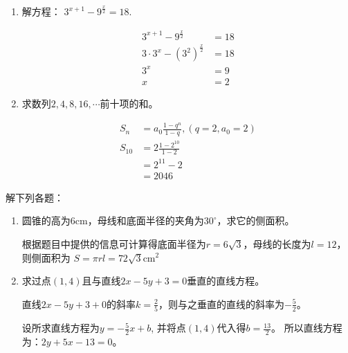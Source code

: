 \documentclass[answers]{exam}
\begin{document}
\begin{questions}
	\begin{enumerate}[label=(\arabic*)]
		\item 解方程： $3^{x+1} - 9^{\frac{x}{2}} = 18$.
		      \begin{solution}
			      \begin{align*}
				      3^{x+1} - 9^{\frac{x}{2}}        & = 18 \\
				      3\cdot 3^x - (3^2)^{\frac{x}{2}} & = 18 \\
				      3^x                              & = 9  \\
				      x                                & = 2
			      \end{align*}
		      \end{solution}
		\item 求数列$2,4,8,16,\cdots $前十项的和。
		      \begin{solution}
			      \begin{align*}
				      S_n    & = a_0\frac{1-q^n}{1-q}, (q=2, a_0=2) \\
				      S_{10} & = 2\frac{1-2^{10}}{1-2}              \\
				             & = 2^{11} - 2                         \\
				             & = 2046
			      \end{align*}
		      \end{solution}
	\end{enumerate}

	\question 解下列各题：
	\begin{enumerate}[label=(\arabic*)]
		\item 圆锥的高为$6$cm，母线和底面半径的夹角为$30^\circ$，求它的侧面积。
		      \begin{solution}
			      根据题目中提供的信息可计算得底面半径为$r = 6\sqrt{3}$，母线的长度为$l = 12$，则侧面积为
			      \begin{math}
				      S = \pi r l = 72\sqrt{3} \text{cm}^2
			      \end{math}
		      \end{solution}
		\item 求过点$(1,4)$且与直线$2x - 5y + 3 = 0$垂直的直线方程。
		      \begin{solution}
			      直线$2x - 5y + 3 + 0$的斜率$k=\frac25$，则与之垂直的直线的斜率为$-\frac52$。

			      设所求直线方程为$y =
				      -\frac52x+b$, 并将点$(1,4)$代入得$b = \frac{13}{2}$。
			      所以直线方程为：$2y + 5x - 13 = 0$。
		      \end{solution}
	\end{enumerate}


\end{questions}
\end{document}
